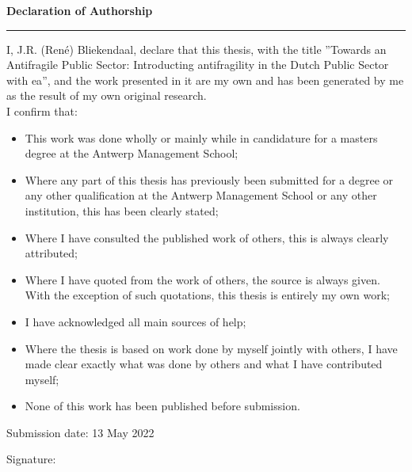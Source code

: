 \thispagestyle{plain}
\vspace*{\fill}
\LARGE
\noindent \textbf{Declaration of Authorship}
\hrule
\normalsize
\bigskip
\noindent
I, J.R. (René) Bliekendaal, declare that this thesis, with the title ''Towards an Antifragile Public Sector: Introducting \Gls{antifragility} in the Dutch Public Sector with \gls{ea}'', and the work presented in it are my own and has been generated by me as the result of my own original research.\\

\noindent I confirm that:
\begin{itemize}
	\item{This work was done wholly or mainly while in candidature for a masters degree at the Antwerp Management School;}
	\item{Where any part of this thesis has previously been submitted for a degree or any other qualification at the Antwerp Management School or any other institution, this has been clearly stated;}
	\item{Where I have consulted the published work of others, this is always clearly attributed;}
	\item{Where I have quoted from the work of others, the source is always given. With the exception of such quotations, this thesis is entirely my own work;}
	\item{I have acknowledged all main sources of help;}
	\item{Where the thesis is based on work done by myself jointly with others, I have made clear exactly what was done by others and what I have contributed myself;}
	\item{None of this work has been published before submission.}
\end{itemize}
\bigskip

\noindent
Submission date: 13 May 2022
\bigskip

\noindent Signature: \makebox[2in]{\hrulefill}\\
\vspace*{\fill}
